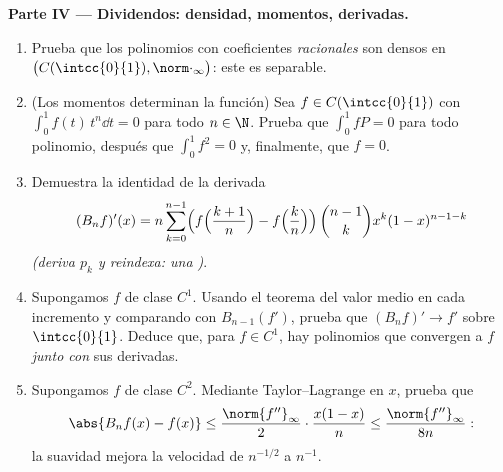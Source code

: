 \begin{problem}
\medskip
\noindent\textbf{Parte IV --- Dividendos: densidad, momentos,
derivadas.}
\begin{enumerate}[resume]
  \item Prueba que los polinomios con coeficientes
        \emph{racionales} son densos en $\bigl(C(\intcc{0}{1}),
        \norm\cdot_\infty\bigr)$: este  es
        separable.
  \item (Los momentos determinan la función) Sea $f \in
        C(\intcc{0}{1})$ con $\int_0^1 f(t)\,t^n \dd t = 0$ para
        todo $n \in \N$. Prueba que $\int_0^1 f P = 0$ para todo
        polinomio, después que $\int_0^1 f^2 = 0$ y, finalmente, que
        $f = 0$.
  \item Demuestra la identidad de la derivada
        \[
        (B_nf)'(x) = n\sum_{k=0}^{n-1}\Bigl(
        f\Bigl(\frac{k+1}{n}\Bigr) -
        f\Bigl(\frac kn\Bigr)\Bigr)\,
        \binom{n-1}{k}x^k(1-x)^{n-1-k}
        \]
        \emph{(deriva $p_k$ y reindexa: una )}.
  \item Supongamos $f$ de clase $C^1$. Usando el teorema del valor
        medio en cada incremento y comparando con $B_{n-1}(f')$,
        prueba que $(B_nf)' \to f'$  sobre
        $\intcc{0}{1}$. Deduce que, para $f \in C^1$, hay
        polinomios que convergen a $f$ \emph{junto con} sus
        derivadas.
  \item Supongamos $f$ de clase $C^2$. Mediante Taylor--Lagrange en
        $x$, prueba que
        \[
        \abs{B_nf(x) - f(x)} \leq
        \frac{\norm{f''}_\infty}{2}\cdot\frac{x(1-x)}{n}
        \leq \frac{\norm{f''}_\infty}{8n} :
        \]
        la suavidad mejora la velocidad de $n^{-1/2}$ a $n^{-1}$.
\end{enumerate}


\end{problem}
